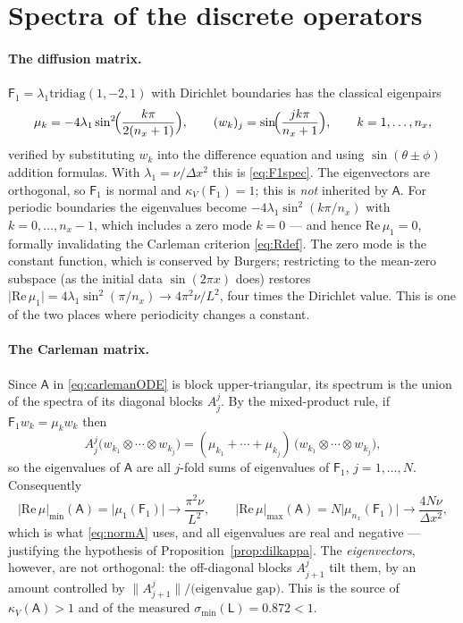 \documentclass[11pt,a4paper]{article}
\theoremstyle{plain}
\theoremstyle{definition}
\theoremstyle{remark}
\newcommand{\norm}[1]{\lVert #1 \rVert}
\newcommand{\abs}[1]{\lvert #1 \rvert}
\newcommand{\Lmat}{\mathsf{L}}
\newcommand{\Amat}{\mathsf{A}}
\newcommand{\Fone}{\mathsf{F}_1}
\begin{document}
\section{Spectra of the discrete operators}
\label{app:spectra}

\paragraph{The diffusion matrix.}  $\Fone=\lambda_1\mathrm{tridiag}(1,-2,1)$ with
Dirichlet boundaries has the classical eigenpairs
\begin{equation}
\mu_k=-4\lambda_1\sin^{2}\!\Bigl(\frac{k\pi}{2(n_x+1)}\Bigr),
\qquad
(w_k)_j=\sin\!\Bigl(\frac{jk\pi}{n_x+1}\Bigr),
\qquad k=1,\dots,n_x,
\end{equation}
verified by substituting $w_k$ into the difference equation and using
$\sin(\theta\pm\phi)$ addition formulas.  With $\lambda_1=\nu/\Delta x^2$ this is
\eqref{eq:F1spec}.  The eigenvectors are orthogonal, so $\Fone$ is normal and
$\kappa_V(\Fone)=1$; this is \emph{not} inherited by $\Amat$.  For periodic
boundaries the eigenvalues become
$-4\lambda_1\sin^2(k\pi/n_x)$ with $k=0,\dots,n_x-1$, which includes a zero mode
$k=0$ --- and hence $\mathrm{Re}\,\mu_1=0$, formally invalidating the Carleman
criterion \eqref{eq:Rdef}.  The zero mode is the constant function, which is
conserved by Burgers; restricting to the mean-zero subspace (as the initial data
$\sin(2\pi x)$ does) restores $\abs{\mathrm{Re}\,\mu_1}=4\lambda_1\sin^2(\pi/n_x)
\to4\pi^{2}\nu/L^{2}$, four times the Dirichlet value.  This is one of the two
places where periodicity changes a constant.

\paragraph{The Carleman matrix.}  Since $\Amat$ in \eqref{eq:carlemanODE} is
block upper-triangular, its spectrum is the union of the spectra of its diagonal
blocks $A^j_j$.  By the mixed-product rule, if $\Fone w_k=\mu_kw_k$ then
\begin{equation}
A^j_j\bigl(w_{k_1}\otimes\cdots\otimes w_{k_j}\bigr)
=(\mu_{k_1}+\cdots+\mu_{k_j})\,\bigl(w_{k_1}\otimes\cdots\otimes w_{k_j}\bigr),
\end{equation}
so the eigenvalues of $\Amat$ are all $j$-fold sums of eigenvalues of $\Fone$,
$j=1,\dots,N$.  Consequently
\begin{equation}
\abs{\mathrm{Re}\,\mu}_{\min}(\Amat)=\abs{\mu_1(\Fone)}\to\frac{\pi^{2}\nu}{L^{2}},
\qquad
\abs{\mathrm{Re}\,\mu}_{\max}(\Amat)=N\abs{\mu_{n_x}(\Fone)}\to\frac{4N\nu}{\Delta x^{2}},
\end{equation}
which is what \eqref{eq:normA} uses, and all eigenvalues are real and negative
--- justifying the hypothesis of Proposition~\ref{prop:dilkappa}.  The
\emph{eigenvectors}, however, are not orthogonal: the off-diagonal blocks
$A^j_{j+1}$ tilt them, by an amount controlled by
$\norm{A^j_{j+1}}/\bigl(\text{eigenvalue gap}\bigr)$.  This is the source of
$\kappa_V(\Amat)>1$ and of the measured $\sigma_{\min}(\Lmat)=0.872<1$.
\end{document}
